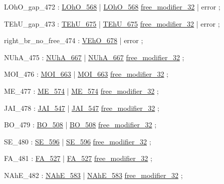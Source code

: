 \label{html:y472}
LOhO_gap_472            :  \hyperref[html:y568]{LOhO_568}
                        |  \hyperref[html:y568]{LOhO_568}  \hyperref[html:y32]{free_modifier_32}
                        |  error
                        ;

\label{html:y473}
TEhU_gap_473            :  \hyperref[html:y675]{TEhU_675}
                        |  \hyperref[html:y675]{TEhU_675}  \hyperref[html:y32]{free_modifier_32}
                        |  error
                        ;

\label{html:y474}
right_br_no_free_474    :  \hyperref[html:y678]{VEhO_678}
                        |  error
                        ;

\label{html:y475}
NUhA_475                :  \hyperref[html:y667]{NUhA_667}
                        |  \hyperref[html:y667]{NUhA_667}  \hyperref[html:y32]{free_modifier_32}
                        ;

\label{html:y476}
MOI_476                 :  \hyperref[html:y663]{MOI_663}
                        |  \hyperref[html:y663]{MOI_663}  \hyperref[html:y32]{free_modifier_32}
                        ;

\label{html:y477}
ME_477                  :  \hyperref[html:y574]{ME_574}
                        |  \hyperref[html:y574]{ME_574}  \hyperref[html:y32]{free_modifier_32}
                        ;

\label{html:y478}
JAI_478                 :  \hyperref[html:y547]{JAI_547}
                        |  \hyperref[html:y547]{JAI_547}  \hyperref[html:y32]{free_modifier_32}
                        ;

\label{html:y479}
BO_479                  :  \hyperref[html:y508]{BO_508}
                        |  \hyperref[html:y508]{BO_508}  \hyperref[html:y32]{free_modifier_32}
                        ;

\label{html:y480}
SE_480                  :  \hyperref[html:y596]{SE_596}
                        |  \hyperref[html:y596]{SE_596}  \hyperref[html:y32]{free_modifier_32}
                        ;

\label{html:y481}
FA_481                  :  \hyperref[html:y527]{FA_527}
                        |  \hyperref[html:y527]{FA_527}  \hyperref[html:y32]{free_modifier_32}
                        ;

\label{html:y482}
NAhE_482                :  \hyperref[html:y583]{NAhE_583}
                        |  \hyperref[html:y583]{NAhE_583}  \hyperref[html:y32]{free_modifier_32}
                        ;

